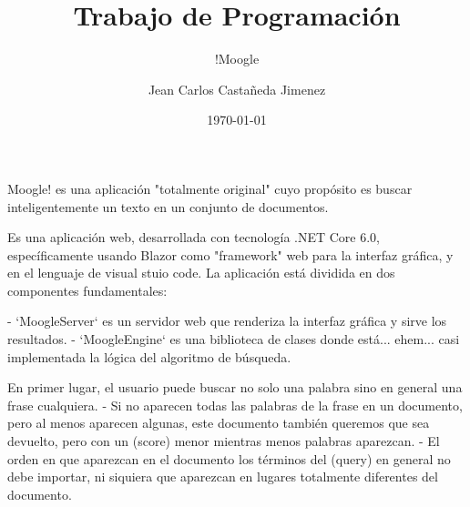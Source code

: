 \documentclass{beamer}
\title{Trabajo de Programación}
\subtitle{!Moogle}
\author{Jean Carlos Castañeda Jimenez}
\institute{Facultad MATCOM - Universidad de La Habana}
\date{\today}
\begin{document}
\begin{frame}
    \titlepage
\end{frame}

\begin{frame}
Moogle! es una aplicación "totalmente original" cuyo propósito es buscar inteligentemente un texto en un conjunto de documentos.

Es una aplicación web, desarrollada con tecnología .NET Core 6.0, específicamente usando Blazor como "framework" web para la interfaz gráfica, y en el lenguaje de visual stuio code.
La aplicación está dividida en dos componentes fundamentales:

- `MoogleServer` es un servidor web que renderiza la interfaz gráfica y sirve los resultados.
- `MoogleEngine` es una biblioteca de clases donde está... ehem... casi implementada la lógica del algoritmo de búsqueda.

 En primer lugar, el usuario puede buscar no solo una palabra sino en general una frase cualquiera.
- Si no aparecen todas las palabras de la frase en un documento, pero al menos aparecen algunas, este documento también queremos que sea devuelto, pero con un (score) menor mientras menos palabras aparezcan.
- El orden en que aparezcan en el documento los términos del (query) en general no debe importar, ni siquiera que aparezcan en lugares totalmente diferentes del documento.
\end{frame}
\end{document}
